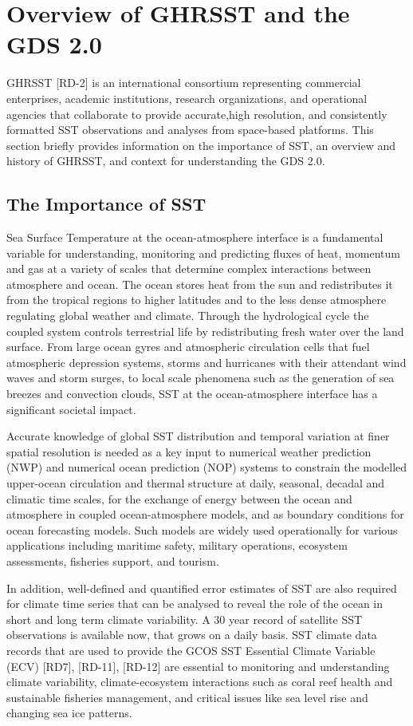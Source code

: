 \pagebreak
\section{Overview of GHRSST and the GDS 2.0}
GHRSST [RD-2] is an international consortium representing commercial enterprises, academic
institutions, research organizations, and operational agencies that collaborate to provide accurate,high resolution, and consistently formatted SST observations and analyses from space-based
platforms. This section briefly provides information on the importance of SST, an overview and
history of GHRSST, and context for understanding the GDS 2.0.
\subsection{The Importance of SST}
Sea Surface Temperature at the ocean-atmosphere interface is a fundamental variable for understanding, monitoring and predicting fluxes of heat, momentum and gas at a variety of scales that determine complex interactions between atmosphere and ocean.
The ocean stores heat from the sun and redistributes it from the tropical regions to higher latitudes and to the less dense atmosphere regulating global weather and climate.
Through the hydrological cycle the coupled system controls terrestrial life by redistributing fresh water over the land surface.
From large ocean gyres and atmospheric circulation cells that fuel atmospheric depression systems, storms and hurricanes with their attendant wind waves and storm surges, to local scale phenomena such as the generation of sea breezes and convection clouds, SST at the ocean-atmosphere interface has a significant societal impact.
\par\vspace{0.25cm}
\noindent Accurate knowledge of global SST distribution and temporal variation at finer spatial resolution is needed as a key input to numerical weather prediction (NWP) and numerical ocean prediction (NOP) systems to constrain the modelled upper-ocean circulation and thermal structure at daily, seasonal, decadal and climatic time scales, for the exchange of energy between the ocean and atmosphere in coupled ocean-atmosphere models, and as boundary conditions for ocean forecasting models.
Such models are widely used operationally for various applications including maritime safety, military operations, ecosystem assessments, fisheries support, and tourism.
\par\vspace{0.25cm}
\noindent In addition, well-defined and quantified error estimates of SST are also required for climate time series that can be analysed to reveal the role of the ocean in short and long term climate variability.
A 30 year record of satellite SST observations is available now, that grows on a daily basis.
SST climate data records that are used to provide the GCOS SST Essential Climate Variable (ECV) [RD7], [RD-11], [RD-12] are essential to monitoring and understanding climate variability, climate-ecosystem interactions such as coral reef health and sustainable fisheries management, and critical issues like sea level rise and changing sea ice patterns.
